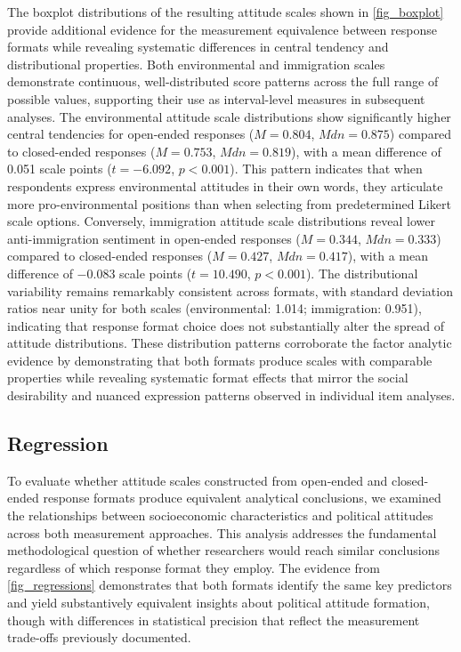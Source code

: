 \documentclass[
  journal=ram,
  manuscript=article-type,
  year=2025,
  volume=unpublished,
]{cup-journal}
\begin{document}
The boxplot distributions of the resulting attitude scales shown in \ref{fig_boxplot} provide additional evidence for the measurement equivalence between response formats while revealing systematic differences in central tendency and distributional properties.
Both environmental and immigration scales demonstrate continuous, well-distributed score patterns across the full range of possible values, supporting their use as interval-level measures in subsequent analyses.
The environmental attitude scale distributions show significantly higher central tendencies for open-ended responses ($M = 0.804$, $Mdn = 0.875$) compared to closed-ended responses ($M = 0.753$, $Mdn = 0.819$), with a mean difference of 0.051 scale points ($t = -6.092$, $p < 0.001$).
This pattern indicates that when respondents express environmental attitudes in their own words, they articulate more pro-environmental positions than when selecting from predetermined Likert scale options.
Conversely, immigration attitude scale distributions reveal lower anti-immigration sentiment in open-ended responses ($M = 0.344$, $Mdn = 0.333$) compared to closed-ended responses ($M = 0.427$, $Mdn = 0.417$), with a mean difference of $-0.083$ scale points ($t = 10.490$, $p < 0.001$).
The distributional variability remains remarkably consistent across formats, with standard deviation ratios near unity for both scales (environmental: 1.014; immigration: 0.951), indicating that response format choice does not substantially alter the spread of attitude distributions.
These distribution patterns corroborate the factor analytic evidence by demonstrating that both formats produce scales with comparable properties while revealing systematic format effects that mirror the social desirability and nuanced expression patterns observed in individual item analyses.

\subsection{Regression}

To evaluate whether attitude scales constructed from open-ended and closed-ended response formats produce equivalent analytical conclusions, we examined the relationships between socioeconomic characteristics and political attitudes across both measurement approaches.
This analysis addresses the fundamental methodological question of whether researchers would reach similar conclusions regardless of which response format they employ.
The evidence from \ref{fig_regressions} demonstrates that both formats identify the same key predictors and yield substantively equivalent insights about political attitude formation, though with differences in statistical precision that reflect the measurement trade-offs previously documented.
\end{document}
